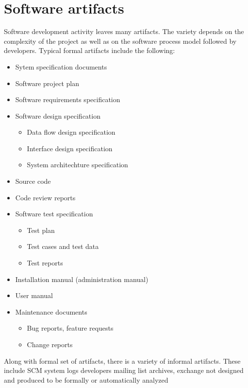\chapter{Software artifacts}
Software development activity leaves many artifacts. The variety depends on the complexity of the project 
as well as on the software process model followed by developers. Typical formal artifacts include the 
following: 
\begin{itemize}
 \item Sytem specification documents
 \item Software project plan
 \item Software requirements specification
 \item Software design specification
  \begin{itemize}
   \item Data flow design specification
   \item Interface design specification
   \item System architechture specification
  \end{itemize}
 \item Source code
 \item Code review reports
 \item Software test specification
  \begin{itemize}
   \item Test plan
   \item Test cases and test data
   \item Test reports
  \end{itemize}
 \item Installation manual (administration manual)
 \item User manual
 \item Maintenance documents
  \begin{itemize}
   \item Bug reports, feature requests
   \item Change reports
  \end{itemize}
\end{itemize}
Along with formal set of artifacts, there is a variety of informal artifacts. These include SCM system logs
developers mailing list archives, exchange not designed 
and produced to be formally or automatically analyzed


